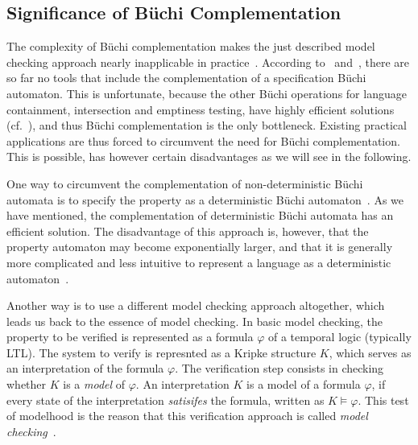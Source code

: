 \subsection{Significance of Büchi Complementation}
The complexity of Büchi complementation makes the just described model checking approach nearly inapplicable in practice~\cite{1995_tasiran}. According to~\cite{2007_vardi_model_checking} and~\cite{2007_vardi}, there are so far no tools that include the complementation of a specification Büchi automaton. This is unfortunate, because the other Büchi operations for language containment, intersection and emptiness testing, have highly efficient solutions~\cite{2007_vardi_model_checking} (cf.~\cite{1996_vardi}), and thus Büchi complementation is the only bottleneck. Existing practical applications are thus forced to circumvent the need for Büchi complementation. This is possible, has however certain disadvantages as we will see in the following.

One way to circumvent the complementation of non-deterministic Büchi automata is to specify the property as a deterministic Büchi automaton~\cite{1995_tasiran}\cite{2007_vardi_model_checking}. As we have mentioned, the complementation of deterministic Büchi automata has an efficient solution. The disadvantage of this approach is, however, that the property automaton may become exponentially larger, and that it is generally more complicated and less intuitive to represent a language as a deterministic automaton~\cite{1995_tasiran}.

Another way is to use a different model checking approach altogether, which leads us back to the essence of model checking. In basic model checking, the property to be verified is represented as a formula $\varphi$ of a temporal logic (typically LTL). The system to verify is represnted as a Kripke structure $K$, which serves as an interpretation of the formula $\varphi$. The verification step consists in checking whether $K$ is a \textit{model} of $\varphi$. An interpretation $K$ is a model of a formula $\varphi$, if every state of the interpretation \textit{satisifes} the formula, written as $K \models \varphi$. This test of modelhood is the reason that this verification approach is called \textit{model checking}~\cite{1996_vardi}.

